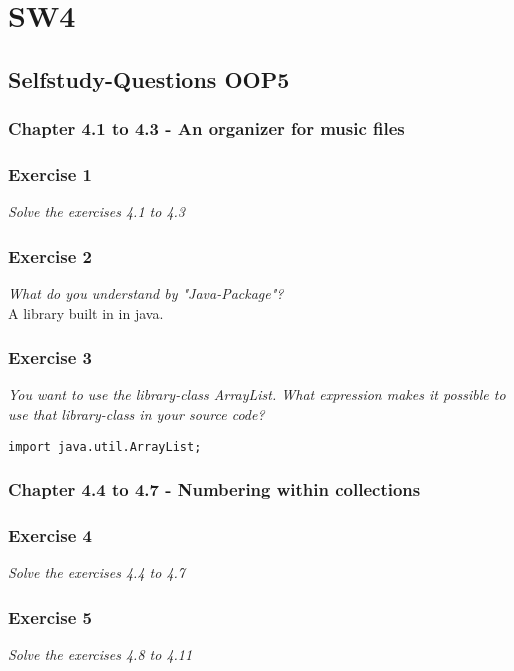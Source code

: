 \section{SW4}
\subsection{Selfstudy-Questions OOP5}

\subsubsection{Chapter 4.1 to 4.3 - An organizer for music files}

\subsubsection*{Exercise 1}
\textit{Solve the exercises 4.1 to 4.3}\\

\subsubsection*{Exercise 2}
\textit{What do you understand by "Java-Package"?}\\
A library built in in java. 

\subsubsection*{Exercise 3}
\textit{You want to use the library-class ArrayList. What expression makes it
possible to use that library-class in your source code?}\\
\begin{lstlisting}
import java.util.ArrayList;
\end{lstlisting}

\subsubsection{Chapter 4.4 to 4.7 - Numbering within collections}

\subsubsection*{Exercise 4}
\textit{Solve the exercises 4.4 to 4.7}\\

\subsubsection*{Exercise 5}
\textit{Solve the exercises 4.8 to 4.11}\\

